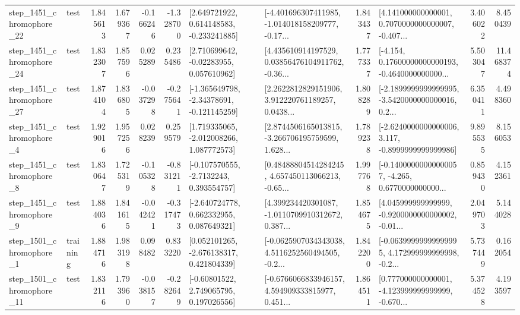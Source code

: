 \begin{tabular}{llrrrrllrlrr}
 step\_1451\_chromophore\_22 &      test &      1.845613 &    1.679367 &     -0.166246 & -1.328700 &    [2.649721922, 0.614148583, -0.233241885] &  [-4.401696307411985, -1.014018158209777, -0.17... &       1.843437 &  [4.141000000000001, 0.7070000000000007, -0.407... &            3.406022 &          8.450439 \\
 step\_1451\_chromophore\_24 &      test &      1.832307 &    1.857596 &      0.025289 &  0.235486 &     [2.710699642, -0.02283955, 0.057610962] &  [4.435610914197529, 0.03856476104911762, -0.36... &       1.777337 &  [-4.154, 0.17600000000000193, -0.4640000000000... &            5.503047 &         11.468374 \\
 step\_1451\_chromophore\_27 &      test &      1.874104 &    1.836805 &     -0.037298 & -0.275641 &   [-1.365649798, -2.34378691, -0.121145259] &  [2.2622812829151906, 3.912220761189257, 0.0438... &       1.808289 &  [-2.1899999999999995, -3.5420000000000016, 0.2... &            6.350411 &          4.498360 \\
  step\_1451\_chromophore\_4 &      test &      1.929016 &    1.957256 &      0.028239 &  0.259579 &    [1.719335065, -2.012008266, 1.087772573] &  [2.8744506165013815, -3.266706195759599, 1.628... &       1.789238 &  [-2.6240000000000006, 3.117, -0.8999999999999986] &            9.895535 &          8.156053 \\
  step\_1451\_chromophore\_8 &      test &      1.830647 &    1.725319 &     -0.105328 & -0.831211 &     [-0.107570555, -2.7132243, 0.393554757] &  [0.48488804514284245, 4.657450113066213, -0.65... &       1.997768 &  [-0.14000000000000057, -4.265, 0.6770000000000... &            0.859430 &          4.152361 \\
  step\_1451\_chromophore\_9 &      test &      1.884036 &    1.841615 &     -0.042421 & -0.317473 &    [-2.640724778, 0.662332955, 0.087649321] &  [4.399234420301087, -1.0110709910312672, 0.387... &       1.854675 &  [4.045999999999999, -0.9200000000000002, -0.01... &            2.049703 &          5.144028 \\
  step\_1501\_chromophore\_1 &  training &      1.884716 &    1.983198 &      0.098482 &  0.833220 &    [0.052101265, -2.676138317, 0.421804339] &  [-0.0625907034343038, 4.5116252560494505, -0.2... &       1.842200 &  [-0.06399999999999995, 4.172999999999998, -0.2... &            5.737449 &          0.162054 \\
 step\_1501\_chromophore\_11 &      test &      1.832116 &    1.793960 &     -0.038157 & -0.282649 &     [-0.60801522, 2.749065795, 0.197026556] &  [-0.6766066833946157, 4.594909333815977, 0.451... &       1.864511 &  [0.777000000000001, -4.123999999999999, -0.670... &            5.374528 &          4.193597 \\

\end{tabular}
